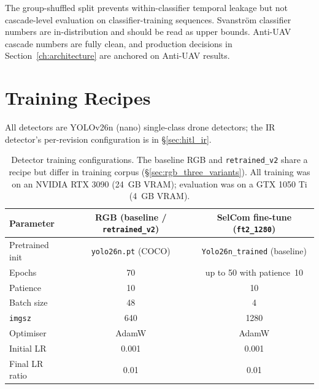 The group-shuffled split prevents within-classifier temporal leakage but not cascade-level evaluation on classifier-training sequences. Svanstr\"om classifier numbers are in-distribution and should be read as upper bounds. Anti-UAV cascade numbers are fully clean, and production decisions in Section~\ref{ch:architecture} are anchored on Anti-UAV results.

\section{Training Recipes}
\label{sec:training_recipes}

All detectors are YOLOv26n (nano) single-class drone detectors; the IR detector's per-revision configuration is in \S\ref{sec:hitl_ir}.

\begin{table}[htbp]
    \centering
    \caption{Detector training configurations. The baseline RGB and \texttt{retrained\_v2} share a recipe but differ in training corpus (\S\ref{sec:rgb_three_variants}). All training was on an NVIDIA RTX 3090 (24~GB VRAM); evaluation was on a GTX 1050 Ti (4~GB VRAM).}
    \label{tab:training_recipes}
    \begin{tabular}{lcc}
        \toprule
        Parameter & RGB (baseline / \texttt{retrained\_v2}) & SelCom fine-tune (\texttt{ft2\_1280}) \\
        \midrule
        Pretrained init   & \texttt{yolo26n.pt} (COCO) & \texttt{Yolo26n\_trained} (baseline)        \\
        Epochs            & 70                         & up to 50 with patience~10                   \\
        Patience          & 10                         & 10                                          \\
        Batch size        & 48                         & 4                                           \\
        \texttt{imgsz}    & 640                        & 1280                                        \\
        Optimiser         & AdamW                      & AdamW                                       \\
        Initial LR        & 0.001                      & 0.001                                       \\
        Final LR ratio    & 0.01                       & 0.01                                        \\

\end{tabular}
\end{table}
